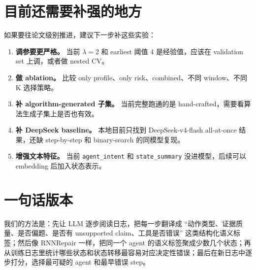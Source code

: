 \documentclass[UTF8,a4paper,11pt]{ctexart}
\begin{document}
\section{目前还需要补强的地方}

如果要往论文级别推进，建议下一步补这些实验：

\begin{enumerate}
  \item \textbf{调参要更严格。} 当前 \(\lambda=2\) 和 earliest 阈值 4 是经验值，应该在 validation set 上调，或者做 nested CV。
  \item \textbf{做 ablation。} 比较 only profile、only risk、combined、不同 window、不同 K 选择策略。
  \item \textbf{补 algorithm-generated 子集。} 当前完整跑通的是 hand-crafted，需要看算法生成子集上是否也有效。
  \item \textbf{补 DeepSeek baseline。} 本地目前只找到 DeepSeek-v4-flash all-at-once 结果，还缺 step-by-step 和 binary-search 的同模型复现。
  \item \textbf{增强文本特征。} 当前 \texttt{agent\_intent} 和 \texttt{state\_summary} 没进模型，后续可以 embedding 后加入状态表示。
\end{enumerate}

\section{一句话版本}

我们的方法是：先让 LLM 逐步阅读日志，把每一步翻译成 ``动作类型、证据质量、是否偏题、是否有 unsupported claim、工具是否错误'' 这类结构化语义标签；然后像 RNNRepair 一样，把同一个 agent 的语义标签聚成少数几个状态；再从训练日志里统计哪些状态和状态转移最容易对应决定性错误；最后在新日志中逐步打分，选择最可疑的 agent 和最早错误 step。
\end{document}
